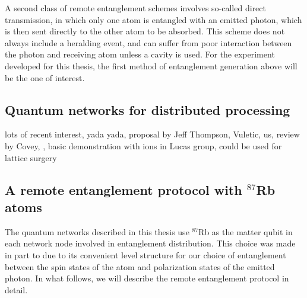 A second class of remote entanglement schemes involves so-called direct transmission, in which only one atom is entangled with an emitted photon, which is then sent directly to the other atom to be absorbed. This scheme does not always include a heralding event, and can suffer from poor interaction between the photon and receiving atom unless a cavity is used. For the experiment developed for this thesis, the first method of entanglement generation above will be the one of interest.

\subsection{Quantum networks for distributed processing}

lots of recent interest, yada yada, proposal by Jeff Thompson, Vuletic, us, review by Covey, \cite{Thompson2024, sinclair2024, Covey2023, Young2022}, basic demonstration with ions in Lucas group, could be used for lattice surgery \cite{Horsman2012}

\subsection{A remote entanglement protocol with $^{87}$Rb atoms}

The quantum networks described in this thesis use $^{87}$Rb as the matter qubit in each network node involved in entanglement distribution. This choice was made in part to due to its convenient level structure for our choice of entanglement between the spin states of the atom and polarization states of the emitted photon. In what follows, we will describe the remote entanglement protocol in detail.


